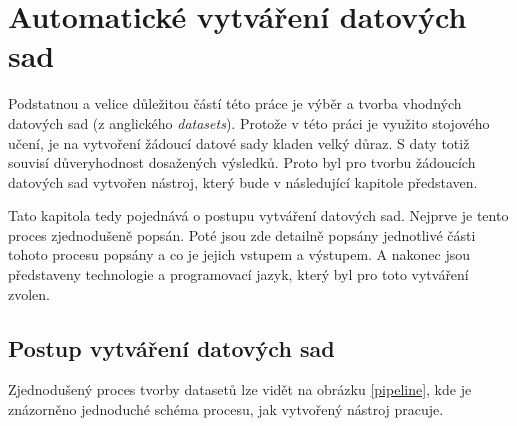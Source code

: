 
\chapter{Automatické vytváření datových sad} \label{3.chap}

Podstatnou a velice důležitou částí této práce je výběr a tvorba vhodných datových sad (z anglického \textit{datasets}).
Protože v této práci je využito stojového učení, je na vytvoření žádoucí datové sady kladen velký důraz. 
S daty totiž souvisí důveryhodnost dosažených výsledků.
Proto byl pro tvorbu žádoucích datových sad vytvořen nástroj, který bude v následující kapitole představen. 

Tato kapitola tedy pojednává o postupu vytváření datových sad. Nejprve je tento proces zjednodušeně popsán.
Poté jsou zde detailně popsány jednotlivé části tohoto procesu popsány a co je jejich vstupem a výstupem.
A nakonec jsou představeny technologie a programovací jazyk, který byl pro toto vytváření zvolen. 


\section{Postup vytváření datových sad}
Zjednodušený proces tvorby datasetů lze vidět na obrázku \ref{pipeline}, kde je znázorněno jednoduché schéma procesu, jak vytvořený nástroj pracuje. 

